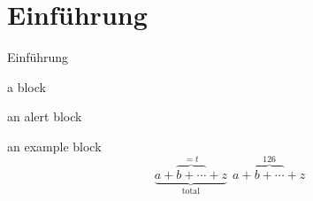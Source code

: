 \section{Einführung}

\begin{frame}{Einführung}
    \begin{block}{a block}
        \lipsum[66]
    \end{block}
\end{frame}

\begin{frame}
    \begin{alertblock}{an alert block}
        \lipsum[75]
    \end{alertblock}
\end{frame}

\begin{frame}
    \begin{exampleblock}{an example block}
$$
\underbrace{a+\overbrace{b+\cdots}^{{}=t}+z}
_{\mathrm{total}} ~~
a+{\overbrace{b+\cdots}}^{126}+z
$$
    \end{exampleblock}
\end{frame}